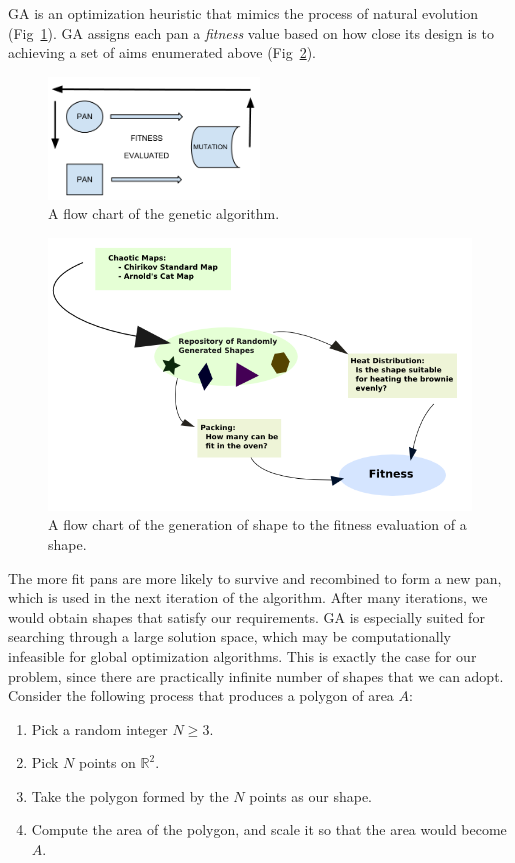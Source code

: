 \documentclass[12pt,draft]{reedmcm}
\begin{document}
GA is an optimization heuristic that mimics the process of natural evolution (Fig~\ref{fig:gaflow}).
GA assigns each pan a \textit{fitness} value based on how close its design is to achieving a set of aims enumerated above (Fig~\ref{fig:fitnessflow}).
%
\begin{figure}[t]
  \centering
  \includegraphics[width=0.5\textwidth]{ga_flowchart}
  \caption{A flow chart of the genetic algorithm.}
  \label{fig:gaflow}
\end{figure}
%
%
\begin{figure}[t]
  \centering
  \includegraphics[width=1.0\textwidth]{fitness_flowchart}
  \caption{A flow chart of the generation of shape to the fitness evaluation of a shape.}
  \label{fig:fitnessflow}
\end{figure}
%
The more fit pans are more likely to survive and recombined to form a new pan, which is used in the next iteration of the algorithm. 
After many iterations, we would obtain shapes that satisfy our requirements.
GA is especially suited for searching through a large solution space, which may be computationally infeasible for global optimization algorithms.
This is exactly the case for our problem, since there are practically infinite number of shapes that we can adopt.
Consider the following process that produces a polygon of area $A$:
\begin{enumerate}
  \item Pick a random integer $N \geq 3$.
  \item Pick $N$ points on $\mathbb{R}^2$.
  \item Take the polygon formed by the $N$ points as our shape.
  \item Compute the area of the polygon, and scale it so that the area would become $A$.
\end{enumerate}
\end{document}
